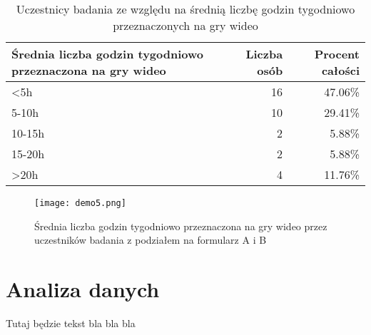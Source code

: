\begin{table}[h!]
    \begin{center}
        \begin{tabular}{|m{15em}|r|r|}
            \hline
            Średnia liczba godzin tygodniowo \newline przeznaczona na gry wideo & Liczba osób & Procent całości \\
            \hline
            <5h                                                                 & 16          & 47.06\%         \\
            5-10h                                                               & 10          & 29.41\%         \\
            10-15h                                                              & 2           & 5.88\%          \\
            15-20h                                                              & 2           & 5.88\%          \\
            >20h                                                                & 4           & 11.76\%         \\
            \hline
        \end{tabular}
    \end{center}
    \caption{Uczestnicy badania ze względu na średnią liczbę godzin tygodniowo przeznaczonych na gry wideo}\label{tab1:ch7_5}
\end{table}

\begin{figure}[h!]
    \centering
    \texttt{[image: demo5.png]}
    \caption{Średnia liczba godzin tygodniowo przeznaczona na gry wideo przez uczestników badania z podziałem na formularz A i B}
    \label{fig:ch7_demo5}
\end{figure}

\section{Analiza danych}\label{section:ch7_2}

Tutaj będzie tekst bla bla bla


